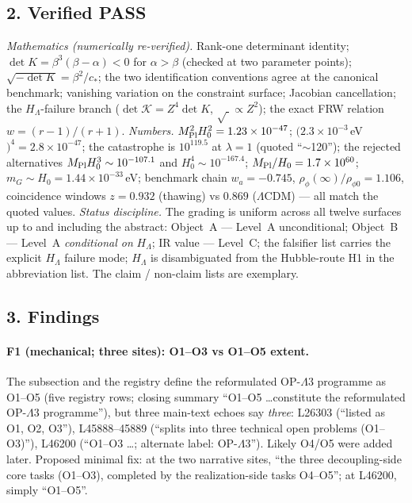 \subsection*{2. Verified PASS}
\emph{Mathematics (numerically re-verified).} Rank-one
determinant identity; $\det K=\beta^3(\beta-\alpha)<0$ for
$\alpha>\beta$ (checked at two parameter points);
$\sqrt{-\det K}=\beta^2/c_*$; the two identification conventions
agree at the canonical benchmark; vanishing variation on the
constraint surface; Jacobian cancellation; the $H_\Lambda$-failure
branch ($\det\mathcal K=Z^4\det K$, $\sqrt{\;}\propto Z^2$);
the exact FRW relation $w=(r-1)/(r+1)$.
\emph{Numbers.} $M_{\rm Pl}^2H_0^2=1.23\times10^{-47}$;
$(2.3\times10^{-3}\,$eV$)^4=2.8\times10^{-47}$; the catastrophe is
$10^{119.5}$ at $\lambda=1$ (quoted ``$\sim$120''); the rejected
alternatives $M_{\rm Pl}H_0^3\sim10^{-107.1}$ and
$H_0^4\sim10^{-167.4}$; $M_{\rm Pl}/H_0=1.7\times10^{60}$;
$m_G\sim H_0=1.44\times10^{-33}$\,eV; benchmark chain
$w_a=-0.745$, $\rho_\phi(\infty)/\rho_{\phi0}=1.106$,
coincidence windows $z=0.932$ (thawing) vs $0.869$
($\Lambda$CDM) --- all match the quoted values.
\emph{Status discipline.} The grading is uniform across all
twelve surfaces up to and including the abstract: Object~A ---
Level~A unconditional; Object~B --- Level~A \emph{conditional on}
$H_\Lambda$; IR value --- Level~C; the falsifier list carries the
explicit $H_\Lambda$ failure mode; $H_\Lambda$ is disambiguated
from the Hubble-route H1 in the abbreviation list. The claim /
non-claim lists are exemplary.

\subsection*{3. Findings}
\paragraph{F1 (mechanical; three sites): O1--O3 vs O1--O5
extent.} The subsection and the registry define the reformulated
OP-$\Lambda$3 programme as O1--O5 (five registry rows; closing
summary ``O1--O5 \ldots constitute the reformulated
OP-$\Lambda$3 programme''), but three main-text echoes say
\emph{three}: L26303 (``listed as O1, O2, O3''), L45888--45889
(``splits into three technical open problems (O1--O3)''),
L46200 (``O1--O3 \ldots; alternate label: OP-$\Lambda$3'').
Likely O4/O5 were added later. Proposed minimal fix: at the two
narrative sites, ``the three decoupling-side core tasks
(O1--O3), completed by the realization-side tasks O4--O5'';
at L46200, simply ``O1--O5''.

